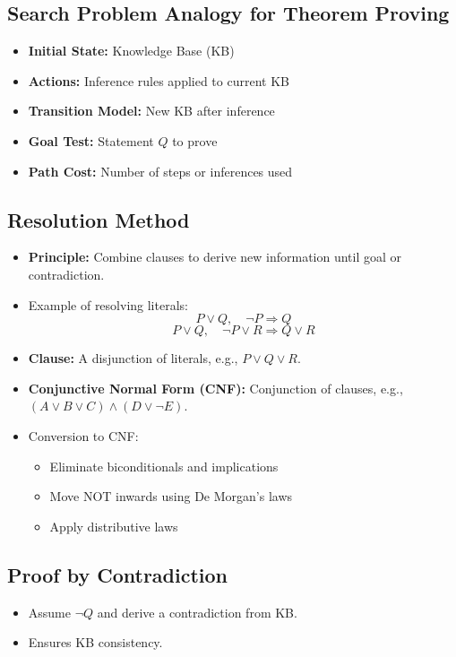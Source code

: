 \subsection{Search Problem Analogy for Theorem Proving}
\begin{itemize}
    \item \textbf{Initial State:} Knowledge Base (KB)
    \item \textbf{Actions:} Inference rules applied to current KB
    \item \textbf{Transition Model:} New KB after inference
    \item \textbf{Goal Test:} Statement $Q$ to prove
    \item \textbf{Path Cost:} Number of steps or inferences used
\end{itemize}

\subsection{Resolution Method}
\begin{itemize}
    \item \textbf{Principle:} Combine clauses to derive new information until goal or contradiction.
    \item Example of resolving literals:
    \[
    P \lor Q, \quad \neg P \Rightarrow Q
    \]
    \[
    P \lor Q, \quad \neg P \lor R \Rightarrow Q \lor R
    \]
    \item \textbf{Clause:} A disjunction of literals, e.g., $P \lor Q \lor R$.
    \item \textbf{Conjunctive Normal Form (CNF):} Conjunction of clauses, e.g., $(A \lor B \lor C) \land (D \lor \neg E)$.
    \item Conversion to CNF:
    \begin{itemize}
        \item Eliminate biconditionals and implications
        \item Move NOT inwards using De Morgan’s laws
        \item Apply distributive laws
    \end{itemize}
\end{itemize}

\subsection{Proof by Contradiction}
\begin{itemize}
    \item Assume $\neg Q$ and derive a contradiction from KB.
    \item Ensures KB consistency.
\end{itemize}

